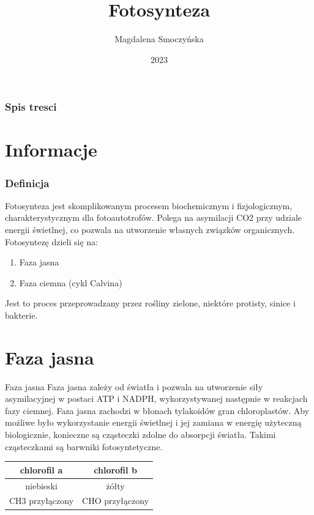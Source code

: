\documentclass{beamer}
\title{Fotosynteza}
\author{Magdalena Smoczyńska}
\institute{Uniwersytet Gdański}
\date{2023}
\begin{document}
	
	\frame{\titlepage}
	\begin{frame}
		\frametitle{Spis tresci}
		\tableofcontents
	\end{frame}

\section{Informacje}
	\begin{frame}
		\frametitle{Definicja}
		Fotosynteza jest skomplikowanym procesem biochemicznym i fizjologicznym, charakterystycznym dla fotoautotrofów. Polega na asymilacji CO2 przy udziale energii świetlnej, co pozwala na utworzenie własnych związków organicznych. Fotosyntezę dzieli się na:
		\begin{enumerate}
			\item Faza jasna
			\item Faza ciemna (cykl Calvina)
		\end{enumerate}
		 Jest to proces przeprowadzany przez rośliny zielone, niektóre protisty, sinice i bakterie.
	\end{frame}

\section{Faza jasna}
	\begin{frame}{Faza jasna}
		Faza jasna zależy od światła i pozwala na utworzenie siły asymilacyjnej w postaci ATP i NADPH, wykorzystywanej następnie w reakcjach fazy ciemnej. Faza jasna zachodzi w błonach tylakoidów gran chloroplastów. Aby możliwe było wykorzystanie energii świetlnej i jej zamiana w energię użyteczną biologicznie, konieczne są cząsteczki zdolne do absorpcji światła. Takimi cząsteczkami są barwniki fotosyntetyczne.
		\begin{table}
			\hfill
		\begin{tabular}{|c||c|}
			\hline
			chlorofil a & chlorofil b \\ 
			\hline
			niebieski & żółty\\ 
			\hline
			CH3 przyłączony & CHO przyłączony\\ 
			\hline
		\end{tabular}
		\end{table}
	\end{frame}
\end{document}
